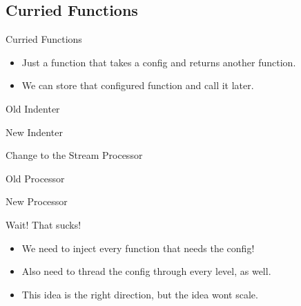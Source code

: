 \documentclass[professionalFonts,aspectratio=169]{beamer}
\begin{document}
\subsection{Curried Functions}

\begin{frame}{Curried Functions}

\begin{itemize}
\item Just a function that takes a config and returns another function.
\pause \item We can store that configured function and call it later.
\end{itemize}

\pause

\begin{block}{Old Indenter}

\end{block}

\begin{block}{New Indenter}

\end{block}

\end{frame}

\begin{frame}{Change to the Stream Processor}

\begin{block}{Old Processor}

\end{block}

\begin{block}{New Processor}

\end{block}

\end{frame}

\begin{frame}{Wait! That sucks!}
\begin{itemize}
\pause \item We need to inject every function that needs the config!
\pause \item Also need to thread the config through every level, as well.
\pause \item This idea is the right direction, but the idea wont scale.
\end{itemize}
\end{frame}
\end{document}
